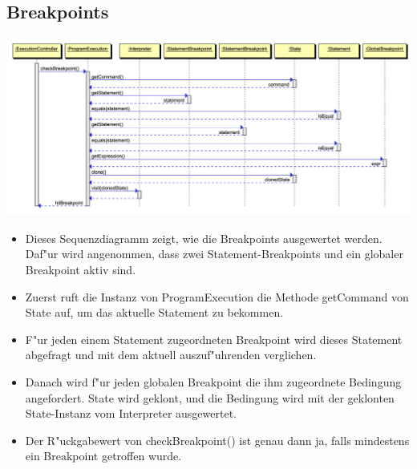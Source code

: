 \documentclass[10pt,a4paper,titlepage]{article}
\begin{document}
\subsection{Breakpoints}
\includegraphics[scale=0.9]{images/Breakpoints.pdf} \newline
\begin{itemize}
\item Dieses Sequenzdiagramm zeigt, wie die Breakpoints ausgewertet werden. Daf"ur wird angenommen, dass zwei Statement-Breakpoints und ein globaler Breakpoint aktiv sind.
\item Zuerst ruft die Instanz von ProgramExecution die Methode getCommand von State auf, um das aktuelle Statement zu bekommen.
\item F"ur jeden einem Statement zugeordneten Breakpoint wird dieses Statement abgefragt und mit dem aktuell auszuf"uhrenden verglichen.
\item Danach wird f"ur jeden globalen Breakpoint die ihm zugeordnete Bedingung angefordert. State wird geklont, und die Bedingung wird mit der geklonten State-Instanz vom Interpreter ausgewertet.
\item Der R"uckgabewert von checkBreakpoint() ist genau dann ja, falls mindestens ein Breakpoint getroffen wurde.
\end{itemize}
\end{document}
